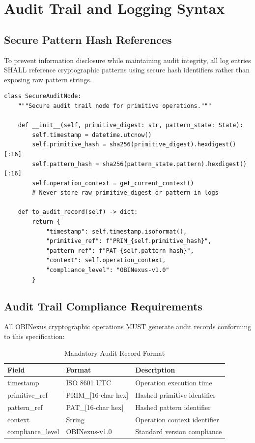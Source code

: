 \documentclass[11pt,a4paper]{article}
\begin{document}
\section{Audit Trail and Logging Syntax}

\subsection{Secure Pattern Hash References}

To prevent information disclosure while maintaining audit integrity, all log entries SHALL reference cryptographic patterns using secure hash identifiers rather than exposing raw pattern strings.

\begin{lstlisting}[caption=Audit Trail Pattern Reference Implementation]
class SecureAuditNode:
    """Secure audit trail node for primitive operations."""
    
    def __init__(self, primitive_digest: str, pattern_state: State):
        self.timestamp = datetime.utcnow()
        self.primitive_hash = sha256(primitive_digest).hexdigest()[:16]
        self.pattern_hash = sha256(pattern_state.pattern).hexdigest()[:16]
        self.operation_context = get_current_context()
        # Never store raw primitive_digest or pattern in logs
    
    def to_audit_record(self) -> dict:
        return {
            "timestamp": self.timestamp.isoformat(),
            "primitive_ref": f"PRIM_{self.primitive_hash}",
            "pattern_ref": f"PAT_{self.pattern_hash}",
            "context": self.operation_context,
            "compliance_level": "OBINexus-v1.0"
        }
\end{lstlisting}

\subsection{Audit Trail Compliance Requirements}

All OBINexus cryptographic operations MUST generate audit records conforming to this specification:

\begin{table}[h]
\centering
\begin{tabular}{|l|l|l|}
\hline
\textbf{Field} & \textbf{Format} & \textbf{Description} \\
\hline
timestamp & ISO 8601 UTC & Operation execution time \\
primitive\_ref & PRIM\_[16-char hex] & Hashed primitive identifier \\
pattern\_ref & PAT\_[16-char hex] & Hashed pattern identifier \\
context & String & Operation context identifier \\
compliance\_level & OBINexus-v1.0 & Standard version compliance \\
\hline
\end{tabular}
\caption{Mandatory Audit Record Format}
\end{table}
\end{document}
